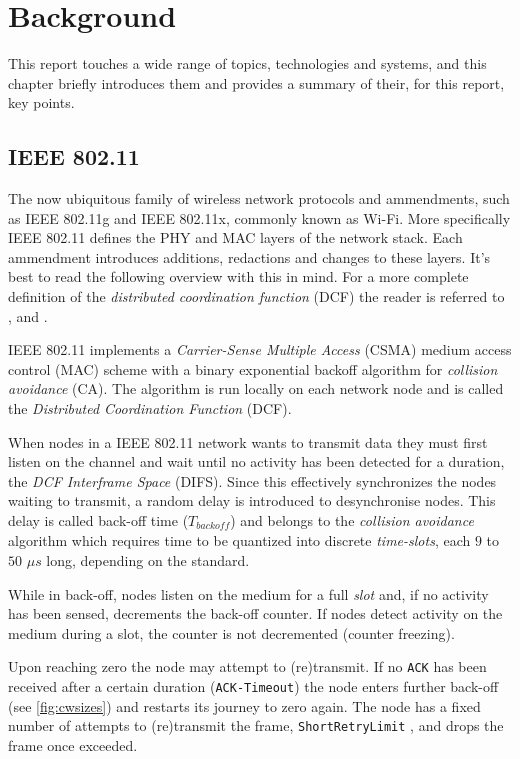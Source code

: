 
\chapter{Background}

This report touches a wide range of topics, technologies and systems, and this
chapter briefly introduces them and provides a summary of their, for this
report, key points.

\section{IEEE 802.11}

The now ubiquitous family of wireless network protocols and ammendments, such
as IEEE 802.11g and IEEE 802.11x, commonly known as Wi-Fi. More specifically
IEEE 802.11 defines the PHY and MAC layers of the network stack. Each
ammendment introduces additions, redactions and changes to these layers. It's
best to read the following overview with this in mind. For a more complete
definition of the \emph{distributed coordination function} (DCF) the reader is
referred to \cite{654749}, \cite{5307322} and \cite{6687187}. 

IEEE 802.11 implements a \emph{Carrier-Sense Multiple Access} (CSMA) medium
access control (MAC) scheme with a binary exponential backoff algorithm for
\emph{collision avoidance} (CA). The algorithm is run locally on each network
node and is called the \emph{Distributed Coordination Function} (DCF). 

When nodes in a IEEE 802.11 network wants to transmit data they must first
listen on the channel and wait until no activity has been detected for a
duration, the \emph{DCF Interframe Space} (DIFS). Since this effectively
synchronizes the nodes waiting to transmit, a random delay is introduced to
desynchronise nodes. This delay is called back-off time
($T_{\mathit{backoff}}$) and belongs to the \emph{collision avoidance}
algorithm which requires time to be quantized into discrete \emph{time-slots},
each $9$ to $50$ $\mu s$ long, depending on the standard. 


While in back-off, nodes listen on the medium for a full \emph{slot} and, if
no activity has been sensed, decrements the back-off counter. If nodes detect
activity on the medium during a slot, the counter is not decremented (counter
freezing). 

Upon reaching zero the node may attempt to (re)transmit. If no \texttt{ACK}
has been received after a certain duration (\texttt{ACK-Timeout}) the node
enters further back-off (see \ref{fig:cwsizes}) and restarts its journey to
zero again. The node has a fixed number of attempts to (re)transmit the frame,
\texttt{ShortRetryLimit} \cite{654749}, and drops the frame once exceeded.

